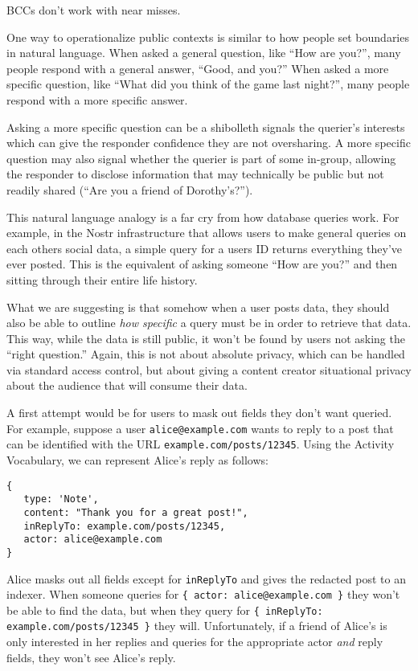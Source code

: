 BCCs don't work with near misses.

One way to operationalize public contexts is similar to how people set boundaries in natural language.
When asked a general question, like ``How are you?'', many people respond with a general answer, ``Good, and you?''
When asked a more specific question, like ``What did you think of the game last night?'', many people respond with a more specific answer.

Asking a more specific question can be a shibolleth
signals the querier's interests
which can give the responder confidence they are not oversharing. A more specific question may also signal whether the querier is part of some in-group, allowing the responder to disclose information that may technically be public but not readily shared (``Are you a friend of Dorothy's?'').

This natural language analogy is a far cry from how database queries work.
For example, in the Nostr infrastructure that allows users to make general queries on each others social data, a simple query for a users ID returns everything they've ever posted. This is the equivalent of asking someone ``How are you?'' and then sitting through their entire life history.

What we are suggesting is that somehow when a user posts data, they should also be able to outline \emph{how specific} a query must be in order to retrieve that data.
This way, while the data is still public, it won't be found by users not asking the ``right question.''
Again, this is not about absolute privacy, which can be handled via standard access control, but about giving a content creator situational privacy about the audience that will consume their data.

A first attempt would be for users to mask out fields they don't want queried.
For example, suppose a user \texttt{alice@example.com} wants to reply to a post that can be identified with the URL \texttt{example.com/posts/12345}.
Using the Activity Vocabulary, we can represent Alice's reply as follows:

\begin{verbatim}
{
   type: 'Note',
   content: "Thank you for a great post!",
   inReplyTo: example.com/posts/12345,
   actor: alice@example.com
}
\end{verbatim}

Alice masks out all fields except for \texttt{inReplyTo} and gives the redacted post to an indexer.
When someone queries for \texttt{\{ actor: alice@example.com \}} they won't be able to find the data, but when they query for \texttt{\{ inReplyTo: example.com/posts/12345 \}} they will.
Unfortunately, if a friend of Alice's is only interested in her replies and queries for the appropriate actor \emph{and} reply fields, they won't see Alice's reply.

